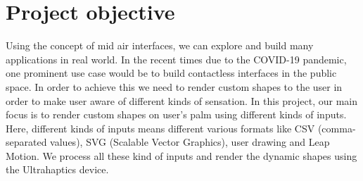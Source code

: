\section{Project objective}
\label{sec:intro:objective}

Using the concept of mid air interfaces, we can explore and build many applications in real world. In the recent times due to the COVID-19 pandemic, one prominent use case would be to build contactless interfaces in the public space. In order to achieve this we need to render custom shapes to the user in order to make user aware of different kinds of sensation.
In this project, our main focus is to render custom shapes on user's palm using different kinds of inputs. Here, different kinds of inputs means different various formats like CSV (comma-separated values), SVG (Scalable Vector Graphics), user drawing and Leap Motion. We process all these kind of inputs and render the dynamic shapes using the Ultrahaptics device. 


